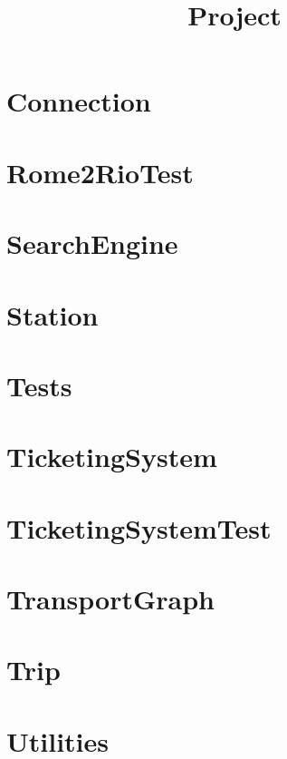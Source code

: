 \documentclass{article}
\begin{document}
\title{Project}
\author{}
\maketitle
\tableofcontents

\section{Connection}

\section{Rome2RioTest}

\section{SearchEngine}

\section{Station}

\section{Tests}

\section{TicketingSystem}

\section{TicketingSystemTest}

\section{TransportGraph}

\section{Trip}

\section{Utilities}

\end{document}
